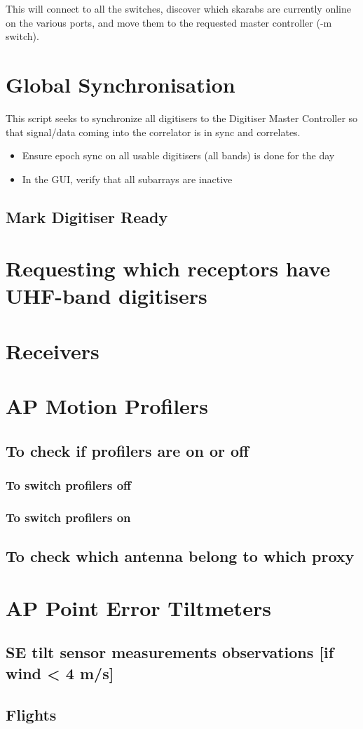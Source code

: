 This will connect to all the switches, discover which skarabs are currently online on the various ports, and move them to the requested master controller (-m switch).



\section{Global Synchronisation}

This script seeks to synchronize all digitisers to the Digitiser Master Controller so that signal/data coming into the correlator is in sync and correlates. 
\begin{itemize}
\item{} Ensure epoch sync on all usable digitisers (all bands) is done for the day
\item{} In the GUI, verify that all subarrays are inactive
\end{itemize}

\subsection{Mark Digitiser Ready}
\section{Requesting which receptors have UHF-band digitisers}
\section{Receivers}
\section{AP Motion Profilers}
\subsection{To check if profilers are on or off}
\subsubsection{To switch profilers off}
\subsubsection{To switch profilers on}
\subsection{To check which antenna belong to which proxy}
\section{AP Point Error Tiltmeters}
\subsection{SE tilt sensor measurements observations [if wind < 4 m/s]}
\subsection{Flights}



	